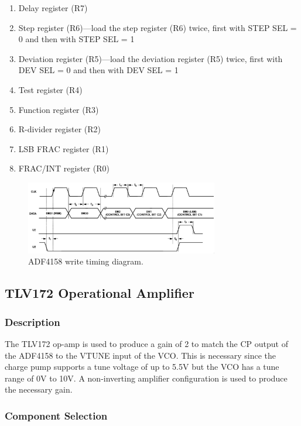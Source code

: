 \begin{enumerate}[noitemsep]
\item Delay register (R7)
\item Step register (R6)—load the step register (R6) twice, first with STEP SEL = 0 and then with
        STEP SEL = 1
\item Deviation register (R5)—load the deviation register (R5) twice, first with DEV SEL = 0 and
        then with DEV SEL = 1
\item Test register (R4)
\item Function register (R3)
\item R-divider register (R2)
\item LSB FRAC register (R1)
\item FRAC/INT register (R0)
\end{enumerate}

\begin{figure}[h]
        \centering
        \includegraphics[width=0.75\textwidth]{data/adf4158-write-timing}
        \caption{ADF4158 write timing diagram.}
        \label{fig:adf4158-write-timing}
\end{figure}

\subsection{TLV172 Operational Amplifier}
\label{sec:tlv172-op-amp}

\subsubsection{Description}
\label{sec:tlv172-description}

The TLV172 op-amp is used to produce a gain of 2 to match the CP output of the ADF4158 to the VTUNE
input of the VCO\@. This is necessary since the charge pump supports a tune voltage of up to 5.5V
but the VCO has a tune range of 0V to 10V. A non-inverting amplifier configuration is used to
produce the necessary gain.

\subsubsection{Component Selection}
\label{sec:tlv172-component-selection}

